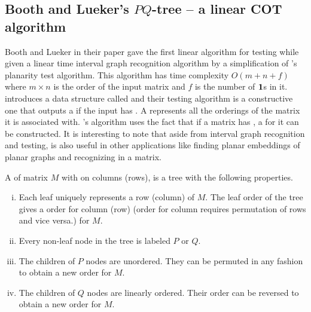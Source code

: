 \subsection{Booth and Lueker's $PQ$-tree -- a linear COT algorithm} %


Booth and Lueker in their paper \cite{bl76} gave the first linear
algorithm for \cop testing while given a linear time interval graph
recognition algorithm by a simplification of \cite{lec67}'s planarity
test algorithm. This \COT algorithm has time complexity
$O\left(m+n+f\right)$ where $m \times n$ is the order of the input
matrix and $f$ is the number of $\textbf{1}$s in it.
%
\cite{bl76} introduces a data structure called \PQtree and their \COP
testing algorithm is a constructive one that outputs a \PQtree if the
input has \COP. A \PQtree represents all the \COP orderings of the
matrix it is associated with. \cite{bl76}'s algorithm uses the fact
that if a matrix has \COP, a \PQtree for it can be constructed. It is
interesting to note that aside from interval graph recognition and
\COP testing, \PQtree is also useful in other applications like
finding planar embeddings of planar graphs \cite{lec67,mcc04} and
recognizing \CROP in a matrix.

\begin{definition}
  A \PQtree of matrix $M$ with \COP on columns (rows), is a tree with
  the following properties.
  \begin{enumerate}[i.]
    \singlespacing
  \item Each leaf uniquely represents a row (column) of $M$. The leaf
    order of the tree gives a \COP order for column (row) (\COP order
    for column requires permutation of rows and vice versa.) for $M$.
  \item Every non-leaf node in the tree is labeled $P$ or $Q$.
  \item \label{def::nodep} The children of $P$ nodes are
    unordered. They can be permuted in any fashion to obtain a new
    \COP order for $M$.
  \item \label{def::nodeq} The children of $Q$ nodes are linearly
    ordered. Their order can be reversed to obtain a new \COP
    order for $M$.
  \end{enumerate}
  \label{def:pqtree}
\end{definition}

